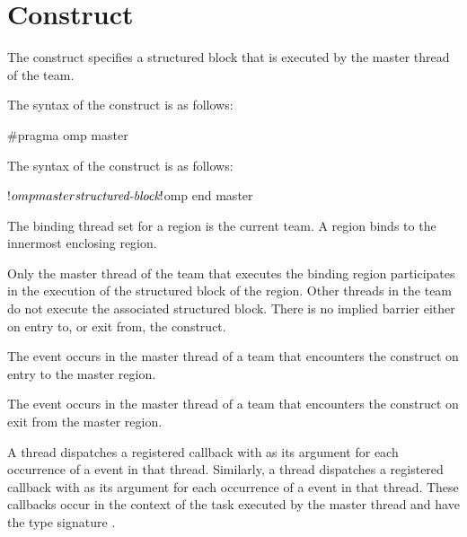 \section{ Construct}
\label{sec:master}
\summary
The  construct specifies a structured block that is executed by 
the master thread of the team.

\syntax
\begin{ccppspecific}
The syntax of the  construct is as follows:

\begin{ompcPragma}
#pragma omp master 
\end{ompcPragma}
\end{ccppspecific}

\begin{fortranspecific}
The syntax of the  construct is as follows:

\begin{ompfPragma}
!$omp master
   \plc{structured-block}
!$omp end master
\end{ompfPragma}
\end{fortranspecific}

\binding
The binding thread set for a  region is the current team. 
A  region binds to the innermost enclosing  region. 

\descr
Only the master thread of the team that executes the binding  region
participates in the execution of the structured block of the  region.
Other threads in the team do not execute the associated structured block. There is no
implied barrier either on entry to, or exit from, the  construct.

\events

The  event occurs in the master thread of a team that 
encounters the  construct on entry to the master region.

The  event occurs in the master thread of a team that 
encounters the  construct on exit from the master region.

\tools

A thread dispatches a registered  callback 
with  as its  argument for each 
occurrence of a  event in that thread. Similarly, a
thread dispatches a registered  callback 
with  as its  argument for each 
occurrence of a  event in that thread. These callbacks 
occur in the context of the task executed by the master thread and have
the type signature . 

